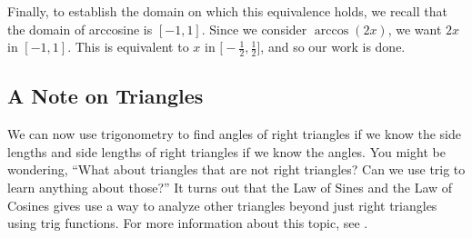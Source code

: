 \documentclass{ximera}
\begin{document}
\begin{example}
\begin{enumerate}
\begin{explanation}
Finally, to establish the domain on which this equivalence holds, we
recall that the domain of arccosine is $[-1,1]$. Since we consider $\arccos(2x)$, we want $2x$ in $[-1,1]$. This is equivalent to $x$ in $\Big[-\frac{1}{2}, \frac{1}{2} \Big]$, and so our work is done.
\end{explanation}
%
\end{enumerate}
\end{example}


\subsection{A Note on Triangles}
We can now use trigonometry to find angles of right triangles if we know the side lengths and side lengths of right triangles if we know the angles.  You might be wondering, ``What about triangles that are not right triangles? Can we use trig to learn anything about those?''  It turns out that the Law of Sines and the Law of Cosines gives use a way to analyze other triangles beyond just right triangles using trig functions.  For more information about this topic, see .
\end{document}
